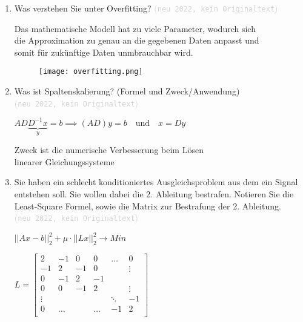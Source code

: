 \documentclass[12pt]{article}
\newcommand{\kommentarMacro}[1]{\textcolor{lightgray}{(\texttt{#1})}}
\begin{document}
\begin{enumerate}
    \item Was verstehen Sie unter Overfitting? \kommentarMacro{neu 2022, kein Originaltext}

          \begin{solution}
              Das mathematische Modell hat zu viele Parameter, wodurch sich \\ die Approximation zu genau an die gegebenen Daten anpasst und \\ somit für zukünftige Daten unmbrauchbar wird.
              \begin{figure}[!ht]
                  \texttt{[image: overfitting.png]}
                  \centering
                  \vspace{-1cm}
              \end{figure}
          \end{solution}

    \item Was ist Spaltenskalierung? (Formel und Zweck/Anwendung) \\ \kommentarMacro{neu 2022, kein Originaltext}

          \begin{solution}
              $AD\underbrace{D^{-1}x}_{y}=b \implies \left(AD\right)y=b \quad\text{und}\quad x=Dy$

              Zweck ist die numerische Verbesserung beim Lösen \\ linearer Gleichungssysteme
          \end{solution}

    \item Sie haben ein schlecht konditioniertes Ausgleichsproblem aus dem ein Signal entstehen soll. Sie wollen dabei die 2. Ableitung bestrafen. Notieren Sie die Least-Square Formel, sowie die Matrix zur Bestrafung der 2. Ableitung. \\ \kommentarMacro{neu 2022, kein Originaltext}

          \begin{solution}
              $||Ax - b||_2^2 + \mu \cdot ||Lx||_2^2 \rightarrow Min$

              \vspace{0.35cm}

              $L=\begin{bmatrix}
                      2      & -1    & 0  & 0     & \dots  & 0      \\
                      -1     & 2     & -1 & 0     &        & \vdots \\
                      0      & -1    & 2  & -1    &        &        \\
                      0      & 0     & -1 & 2     &        & \vdots \\
                      \vdots &       &    &       & \ddots & -1     \\
                      0      & \dots &    & \dots & -1     & 2      \\
                  \end{bmatrix}$
              \vspace{1cm}


\end{solution}
\end{enumerate}
\end{document}
